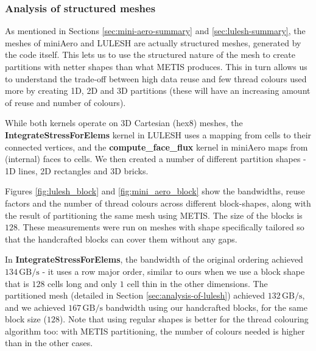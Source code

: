 \subsubsection{Analysis of structured meshes}

As mentioned in Sections \ref{sec:mini-aero-summary} and
\ref{sec:lulesh-summary}, the meshes of miniAero and LULESH are actually structured meshes, generated by the
code itself. This lets us to use the structured nature of the mesh to create partitions with netter shapes than what METIS produces. This in turn allows us to understand the trade-off between
high data reuse and few thread colours used more by creating 1D, 2D and 3D
partitions (these will have an increasing amount of reuse and number of colours).

While both kernels operate on 3D Cartesian (hex8) meshes, the
\textbf{IntegrateStressForElems} kernel in LULESH uses a mapping from cells to their
connected vertices, and the \textbf{compute\_face\_flux} kernel in miniAero maps from
(internal) faces to cells. We then created a number of different partition shapes - 1D lines, 2D rectangles and 3D bricks.


Figures \ref{fig:lulesh_block} and \ref{fig:mini_aero_block} show the
bandwidths, reuse factors and the number of thread colours across different
block-shapes, along with the result of partitioning the same mesh using METIS.
The size of the blocks is $128$. These measurements were run on meshes with
shape specifically tailored so that the handcrafted blocks can cover them
without any gaps.

In \textbf{IntegrateStressForElems}, the bandwidth of the original ordering achieved  $134\,\text{GB/s}$ - it uses a row major order, similar to ours
when we use a block shape that is $128$ cells long and only $1$ cell thin in the
other dimensions. The partitioned mesh (detailed
in Section \ref{sec:analysis-of-lulesh}) achieved $132\,\text{GB/s}$, and we achieved $167\,\text{GB/s}$
bandwidth using our handcrafted blocks, for the same block size ($128$). Note
that using regular shapes is better for the thread colouring algorithm too: with
METIS partitioning, the number of colours needed is higher than in the other
cases.

